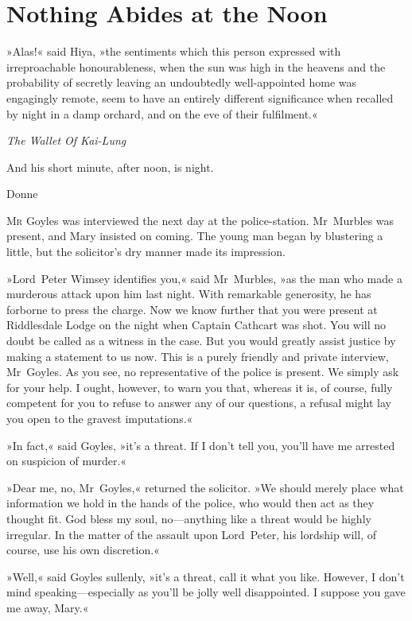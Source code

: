 

\chapter{Nothing Abides at the Noon}


\epigraph{»Alas!« said Hiya, »the sentiments which this person expressed with irreproachable honourableness, when the sun was high in the heavens and the probability of secretly leaving an undoubtedly well-appointed home was engagingly remote, seem to have an entirely different significance when recalled by night in a damp orchard, and on the eve of their fulfilment.«}{\textit{The Wallet Of Kai-Lung}}

\epigraph{And his short minute, after noon, is night.}{Donne}



\lettrine[lines=4]{M}{r} Goyles was interviewed the next day at the police-station. Mr~Murbles was present, and Mary insisted on coming. The young man began by blustering a little, but the solicitor's dry manner made its impression.

»Lord~Peter Wimsey identifies you,« said Mr~Murbles, »as the man who made a murderous attack upon him last night. With remarkable generosity, he has forborne to press the charge. Now we know further that you were present at Riddlesdale Lodge on the night when Captain Cathcart was shot. You will no doubt be called as a witness in the case. But you would greatly assist justice by making a statement to us now. This is a purely friendly and private interview, Mr~Goyles.  As you see, no representative of the police is present. We simply ask for your help. I ought, however, to warn you that, whereas it is, of course, fully competent for you to refuse to answer any of our questions, a refusal might lay you open to the gravest imputations.«

»In fact,« said Goyles, »it's a threat. If I don't tell you, you'll have me arrested on suspicion of murder.«

»Dear me, no, Mr~Goyles,« returned the solicitor. »We should merely place what information we hold in the hands of the police, who would then act as they thought fit. God bless my soul, no—anything like a threat would be highly irregular. In the matter of the assault upon Lord~Peter, his lordship will, of course, use his own discretion.«

»Well,« said Goyles sullenly, »it's a threat, call it what you like.  However, I don't mind speaking—especially as you'll be jolly well disappointed. I suppose you gave me away, Mary.«

